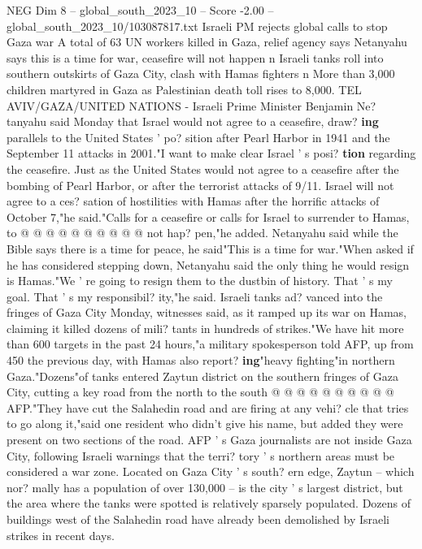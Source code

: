 \begin{textsample}{NEG Dim 8 – global\_south\_2023\_10 – Score -2.00 – global\_south\_2023\_10/103087817.txt}  \label{ex:f8_neg_088}
Israeli PM rejects global calls to stop Gaza war A total of 63 UN workers killed in Gaza, relief agency says Netanyahu says this is a time for war, ceasefire will not happen n Israeli tanks roll into southern outskirts of Gaza City, clash with Hamas fighters n More than 3,000 children martyred in Gaza as Palestinian death toll rises to 8,000.
TEL AVIV/GAZA/UNITED NATIONS - Israeli Prime Minister Benjamin Ne? tanyahu said Monday that Israel would not agree to a ceasefire, draw? \textbf{ing} parallels to the United States ' po? sition after Pearl Harbor in 1941 and the September 11 attacks in 2001."I want to make clear Israel ' s posi? \textbf{tion} regarding the ceasefire.
Just as the United States would not agree to a ceasefire after the bombing of Pearl Harbor, or after the terrorist attacks of 9/11.
Israel will not agree to a ces? sation of hostilities with Hamas after the horrific attacks of October 7,"he said."Calls for a ceasefire or calls for Israel to surrender to Hamas, to @ @ @ @ @ @ @ @ @ @ not hap? pen,"he added.
Netanyahu said while the Bible says there is a time for peace, he said"This is a time for war."When asked if he has considered stepping down, Netanyahu said the only thing he would resign is Hamas."We ' re going to resign them to the dustbin of history.
That ' s my goal.
That ' s my responsibil? ity,"he said.
Israeli tanks ad? vanced into the fringes of Gaza City Monday, witnesses said, as it ramped up its war on Hamas, claiming it killed dozens of mili? tants in hundreds of strikes."We have hit more than 600 targets in the past 24 hours,"a military spokesperson told AFP, up from 450 the previous day, with Hamas also report? \textbf{ing}"heavy fighting"in northern Gaza."Dozens"of tanks entered Zaytun district on the southern fringes of Gaza City, cutting a key road from the north to the south @ @ @ @ @ @ @ @ @ @ AFP."They have cut the Salahedin road and are firing at any vehi? cle that tries to go along it,"said one resident who didn't give his name, but added they were present on two sections of the road.
AFP ' s Gaza journalists are not inside Gaza City, following Israeli warnings that the terri? tory ' s northern areas must be considered a war zone.
Located on Gaza City ' s south? ern edge, Zaytun -- which nor? mally has a population of over 130,000 -- is the city ' s largest district, but the area where the tanks were spotted is relatively sparsely populated.
Dozens of buildings west of the Salahedin road have already been demolished by Israeli strikes in recent days.

\end{textsample}
